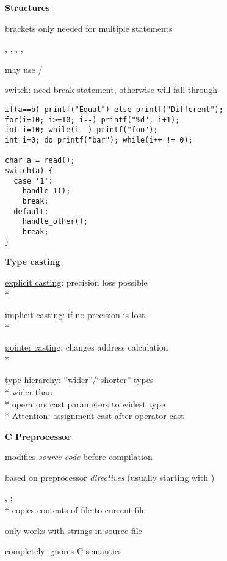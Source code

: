 \textbf{Structures}
\begin{items}
  \item brackets only needed for multiple statements
  \item {}, , , , 
  \item may use /
  \item switch: need break statement, otherwise will fall through
\end{items}
\begin{lstlisting}[style=customc]
if(a==b) printf("Equal") else printf("Different");
for(i=10; i>=10; i--) printf("%d", i+1);
int i=10; while(i--) printf("foo");
int i=0; do printf("bar"); while(i++ != 0);

char a = read();
switch(a) {
  case '1':
    handle_1();
    break;
  default:
    handle_other();
    break;
}
\end{lstlisting}

\textbf{Type casting}
\begin{items}
  \item \underline{explicit casting}: precision loss possible \\*
  \item \underline{implicit casting}: if no precision is lost \\*
  \item \underline{pointer casting}: changes address calculation \\*
  \item \underline{type hierarchy}: "`wider"'/"`shorter"' types \\*
     wider than  \\*
    operators cast parameters to widest type \\*
    Attention: assignment cast after operator cast
\end{items}

\textbf{C Preprocessor}
\begin{items}
  \item modifies \emph{source code} before compilation
  \item based on preprocessor \emph{directives} (usually starting with \code{#})
  \item {}, : \\*
    copies contents of file to current file
  \item only works with strings in source file
  \item completely ignores C semantics
\end{items}

